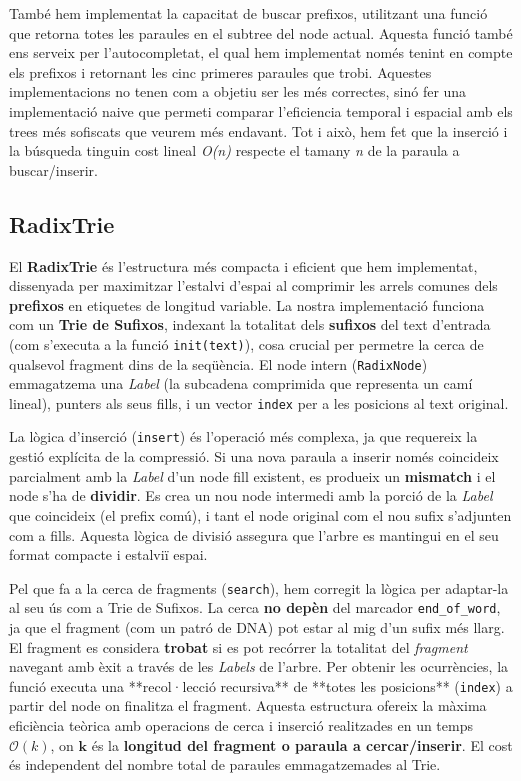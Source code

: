També hem implementat la capacitat de buscar prefixos, utilitzant una funció que retorna totes les paraules en el subtree del node actual. Aquesta funció també ens serveix per l'autocompletat, el qual hem implementat només tenint en compte els prefixos i retornant les cinc primeres paraules que trobi.
Aquestes implementacions no tenen com a objetiu ser les més correctes, sinó fer una implementació naive que permeti comparar l'eficiencia temporal i espacial amb els trees més sofiscats que veurem més endavant. Tot i això, hem fet que la inserció i la búsqueda tinguin cost lineal \textit{O(n)} respecte el tamany \textit{n} de la paraula a buscar/inserir.

\subsection{RadixTrie}
El \textbf{RadixTrie} és l'estructura més compacta i eficient que hem implementat, dissenyada per maximitzar l'estalvi d'espai al comprimir les arrels comunes dels \textbf{prefixos} en etiquetes de longitud variable. La nostra implementació funciona com un \textbf{Trie de Sufixos}, indexant la totalitat dels \textbf{sufixos} del text d'entrada (com s'executa a la funció \texttt{init(text)}), cosa crucial per permetre la cerca de qualsevol fragment dins de la seqüència. El node intern (\texttt{RadixNode}) emmagatzema una \textit{Label} (la subcadena comprimida que representa un camí lineal), punters als seus fills, i un vector \texttt{index} per a les posicions al text original.

La lògica d'inserció (\texttt{insert}) és l'operació més complexa, ja que requereix la gestió explícita de la compressió. Si una nova paraula a inserir només coincideix parcialment amb la \textit{Label} d'un node fill existent, es produeix un \textbf{mismatch} i el node s'ha de \textbf{dividir}. Es crea un nou node intermedi amb la porció de la \textit{Label} que coincideix (el prefix comú), i tant el node original com el nou sufix s'adjunten com a fills. Aquesta lògica de divisió assegura que l'arbre es mantingui en el seu format compacte i estalviï espai.

Pel que fa a la cerca de fragments (\texttt{search}), hem corregit la lògica per adaptar-la al seu ús com a Trie de Sufixos. La cerca \textbf{no depèn} del marcador \texttt{end\_of\_word}, ja que el fragment (com un patró de DNA) pot estar al mig d'un sufix més llarg. El fragment es considera \textbf{trobat} si es pot recórrer la totalitat del \textit{fragment} navegant amb èxit a través de les \textit{Labels} de l'arbre. Per obtenir les ocurrències, la funció executa una **recol·lecció recursiva** de **totes les posicions** (\texttt{index}) a partir del node on finalitza el fragment. Aquesta estructura ofereix la màxima eficiència teòrica amb operacions de cerca i inserció realitzades en un temps $\mathcal{O}(k)$, on $\boldsymbol{k}$ és la \textbf{longitud del fragment o paraula a cercar/inserir}. El cost és independent del nombre total de paraules emmagatzemades al Trie.

